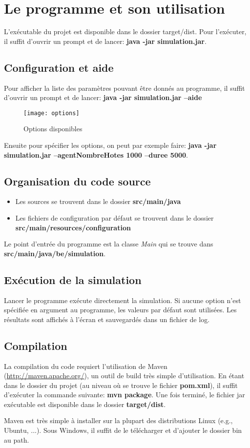 \appendix

\section{Le programme et son utilisation}
L'exécutable du projet est disponible dans le dossier target/dist. Pour l'exécuter, il suffit d'ouvrir un prompt et de lancer: \textbf{java -jar simulation.jar}.

\subsection{Configuration et aide}
Pour afficher la liste des paramètres pouvant être donnés au programme, il suffit d'ouvrir un prompt et de lancer: \textbf{java -jar simulation.jar --aide}


\begin{figure}[h!t]
  \centering
    \texttt{[image: options]}
  \caption{Options disponibles}
  \label{fig:options}
\end{figure}

Ensuite pour spécifier les options, on peut par exemple faire: \textbf{java -jar simulation.jar --agentNombreHotes 1000 --duree 5000}.

\subsection{Organisation du code source}
\begin{itemize}
 \item Les sources se trouvent dans le dossier \textbf{src/main/java}
 \item Les fichiers de configuration par défaut se trouvent dans le dossier \textbf{src/main/resources/configuration}
\end{itemize}

Le point d'entrée du programme est la classe \textit{Main} qui se trouve dans \textbf{src/main/java/be/simulation}.

\subsection{Exécution de la simulation}
Lancer le programme exécute directement la simulation. Si aucune option n'est spécifiée en argument au programme, les valeurs par défaut sont utilisées. Les résultats sont affichés à l'écran et sauvegardés dans un fichier de log.

\subsection{Compilation}
La compilation du code requiert l'utilisation de Maven (\url{http://maven.apache.org/}), un outil de build très simple d'utilisation. En étant dans le dossier du projet (au niveau où se trouve le fichier \textbf{pom.xml}), il suffit d'exécuter la commande suivante: \textbf{mvn package}. Une fois terminé, le fichier jar exécutable est disponible dans le dossier \textbf{target/dist}.

Maven est très simple à installer sur la plupart des distributions Linux (e.g., Ubuntu, ...). Sous Windows, il suffit de le télécharger et d'ajouter le dossier bin au path.